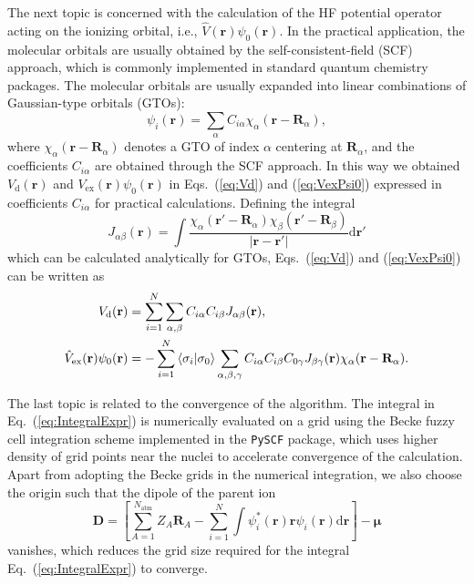 \documentclass[preprint,12pt]{elsarticle} %
\newcommand{\bn}[1]{\mathbf{#1}}    %
\newcommand{\bi}[1]{\bm{#1}}        %
\renewcommand{\rm}[1]{\mathrm{#1}}    %
\newcommand{\dd}{\mathrm{d}}    %
\newcommand{\abs}[1]{\lvert #1 \rvert}  %
\begin{document}
The next topic is concerned with the calculation of the HF potential operator acting on the ionizing orbital, i.e., $\hat{V}(\bn{r}) \psi_0(\bn{r})$. In the practical application, the molecular orbitals are usually obtained by the self-consistent-field (SCF) approach, which is commonly implemented in standard quantum chemistry packages. The molecular orbitals are usually expanded into linear combinations of Gaussian-type orbitals (GTOs):
\begin{equation}
    \psi_i(\bn{r})=\sum_\alpha C_{i \alpha} \chi_\alpha(\bn{r}-\bn{R}_\alpha),
\end{equation}
where $\chi_\alpha(\bn{r}-\bn{R}_\alpha)$ denotes a GTO of index $\alpha$ centering at $\bn{R}_\alpha$, and the coefficients $C_{i \alpha}$ are obtained through the SCF approach.
In this way we obtained $V_{\rm{d}}(\bn{r})$ and $V_{\rm{ex}}(\bn{r})\psi_0(\bn{r})$ in Eqs.~(\ref{eq:Vd}) and (\ref{eq:VexPsi0}) expressed in coefficients $C_{i \alpha}$ for practical calculations. Defining the integral
\begin{equation}
    J_{\alpha\beta}(\bn{r}) = \int \frac{\chi_\alpha(\bn{r}'-\bn{R}_\alpha) \chi_\beta(\bn{r}'-\bn{R}_\beta)}{\abs{\bn{r}-\bn{r}'}} \dd \bn{r}'
\end{equation}
which can be calculated analytically for GTOs,
Eqs.~(\ref{eq:Vd}) and (\ref{eq:VexPsi0}) can be written as
\begin{align}
     V_{\rm{d}}(\bn{r}) &= \sum_{i=1}^{N} \sum_{\alpha,\beta} C_{i\alpha} C_{i\beta} J_{\alpha\beta}(\bn{r}), \\
    \hat{V}_{\rm{ex}}(\bn{r})\psi_0(\bn{r}) &= - \sum_{i=1}^{N} \braket{\sigma_i | \sigma_0} \sum_{\alpha,\beta,\gamma} C_{i\alpha} C_{i\beta} C_{0\gamma} J_{\beta\gamma}(\bn{r}) \chi_\alpha(\bn{r}-\bn{R}_\alpha).
\end{align}

The last topic is related to the convergence of the algorithm. The integral in Eq.~(\ref{eq:IntegralExpr}) is numerically evaluated on a grid using the Becke fuzzy cell integration scheme \cite{becke_multicenter_1988} implemented in the \texttt{PySCF} package, which uses higher density of grid points near the nuclei to accelerate convergence of the calculation. Apart from adopting the Becke grids in the numerical integration, we also choose the origin such that the dipole of the parent ion
\begin{equation}
    \bn{D} = \left[\sum_{A=1}^{N_{\rm{atm}}} Z_A \bn{R}_A - \sum_{i=1}^N \int \psi_i^*(\bn{r}) \bn{r} \psi_i(\bn{r}) \dd \bn{r} \right] - \bi{\mu}
\end{equation}
vanishes, which reduces the grid size required for the integral Eq.~(\ref{eq:IntegralExpr}) to converge.
\end{document}
